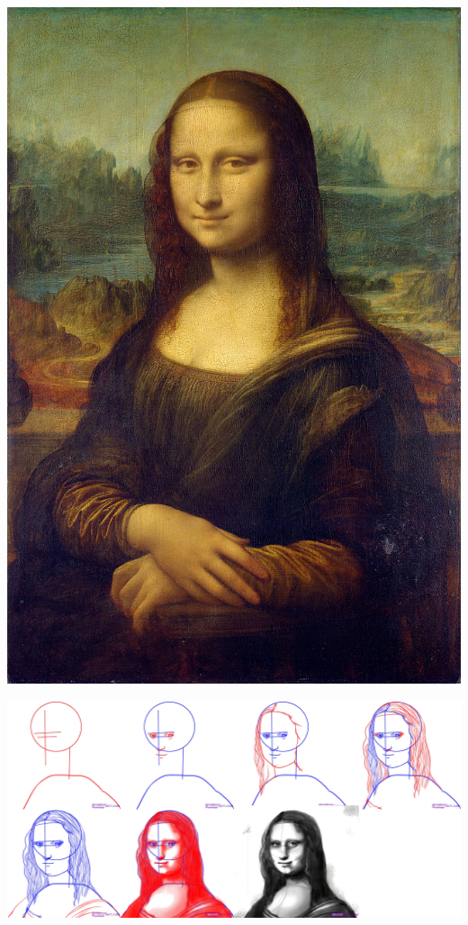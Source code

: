 \documentclass{beamer}
\begin{document}
\begin{frame}[c]
\begin{center}
\hspace*{-0.5cm}\includegraphics[scale=1.0]{MonaLisaOrig.png}
\end{center}
\end{frame}


\begin{frame}[c]
\begin{center}
\hspace*{-1.0cm}\includegraphics[scale=0.12]{MonaLisaStepst.png}
\end{center}
\end{frame}
\end{document}
